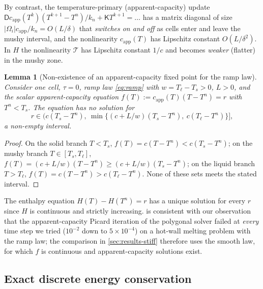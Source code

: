 \documentclass[11pt]{article}
\numberwithin{equation}{section}
\newtheorem{lemma}[proposition]{Lemma}
\theoremstyle{remark}
\newcommand{\Dm}{\mathsf{D}}           %
\newcommand{\K}{\mathsf{K}}
\newcommand{\capp}{c_{\mathrm{app}}}
\begin{document}
By contrast, the temperature-primary (apparent-capacity) update
$\Dm\capp(T^{k})(T^{k+1}-T^n)/k_n+\K T^{k+1}=\dots$ has a matrix diagonal of size
$|\Omega_i|\capp/k_n=O(L/\delta)$ that \emph{switches on and off} as cells enter
and leave the mushy interval, and the nonlinearity $\capp(T)$ has Lipschitz
constant $O(L/\delta^2)$.  In $H$ the nonlinearity $\mathcal T$ has Lipschitz
constant $1/c$ and becomes \emph{weaker} (flatter) in the mushy zone.

\begin{lemma}[Non-existence of an apparent-capacity fixed point for the ramp law]
\label{lem:nonexistence}
Consider one cell, $\tau=0$, ramp law \eqref{eq:ramp} with $w=T_\ell-T_s>0$,
$L>0$, and the scalar apparent-capacity equation $f(T):=\capp(T)(T-T^n)=r$ with
$T^n<T_s$.  The equation has no solution for
\[
  r\in\Big(c(T_s-T^n),\ \min\big\{(c+L/w)(T_s-T^n),\ c(T_\ell-T^n)\big\}\Big],
\]
a non-empty interval.
\end{lemma}
\begin{proof}
On the solid branch $T<T_s$, $f(T)=c(T-T^n)<c(T_s-T^n)$; on the mushy branch
$T\in[T_s,T_\ell]$, $f(T)=(c+L/w)(T-T^n)\ge(c+L/w)(T_s-T^n)$; on the liquid
branch $T>T_\ell$, $f(T)=c(T-T^n)>c(T_\ell-T^n)$.  None of these sets meets the
stated interval.
\end{proof}
The enthalpy equation $H(T)-H(T^n)=r$ has a unique solution for every $r$ since
$H$ is continuous and strictly increasing.   is
consistent with our observation that the apparent-capacity Picard iteration of
the polygonal solver failed at \emph{every} time step we tried
($10^{-2}$ down to $5\times10^{-4}$) on a hot-wall melting problem with the
ramp law; the comparison in \cref{sec:results-stiff} therefore
uses the smooth law, for which $f$ is continuous and apparent-capacity
solutions exist.

\subsection{Exact discrete energy conservation}
\end{document}
